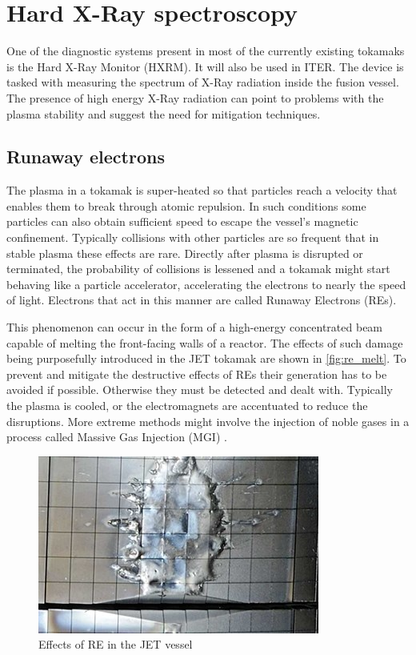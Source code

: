 \section{Hard X-Ray spectroscopy}

One of the diagnostic systems present in most of the currently existing tokamaks
is the Hard X-Ray Monitor (HXRM). It will also be used in ITER.
The device is tasked with measuring the spectrum of X-Ray radiation
inside the fusion vessel. The presence of high energy X-Ray
radiation can point to problems with the plasma stability and suggest the 
need for mitigation techniques.
\cite{low_noise_amplifier_for_pmt}

\subsection{Runaway electrons}

The plasma in a tokamak is super-heated so that particles reach a velocity
that enables them to break through atomic repulsion. In such conditions some 
particles can also obtain sufficient speed to escape the vessel's magnetic confinement.
Typically collisions with other particles are so frequent
that in stable plasma these effects are rare.
Directly after plasma is disrupted or terminated, 
the probability of collisions is lessened 
and a tokamak might start behaving like a particle accelerator,
accelerating the electrons to nearly the speed of light.
Electrons that act in this manner are called Runaway Electrons (REs).
\cite{iter_re_melt}

This phenomenon can occur in the form of a high-energy 
concentrated beam capable of melting the front-facing walls of a reactor.
The effects of such damage being purposefully introduced in the JET tokamak
are shown in \autoref{fig:re_melt}. To prevent and mitigate the destructive
effects of REs their generation has to be avoided if possible. Otherwise
they must be detected and dealt with. Typically the plasma 
is cooled, or the electromagnets are accentuated
to reduce the disruptions. More extreme methods might 
involve the injection of noble gases in a process called 
Massive Gas Injection (MGI) \cite{massive_gas_injection}.
\begin{figure}[H]
  \centering
  \includegraphics[width=.7\linewidth]{media/re_melt.jpeg}
  \caption{Effects of RE in the JET vessel\cite{iter_re_melt}}
  \label{fig:re_melt}
\end{figure}


